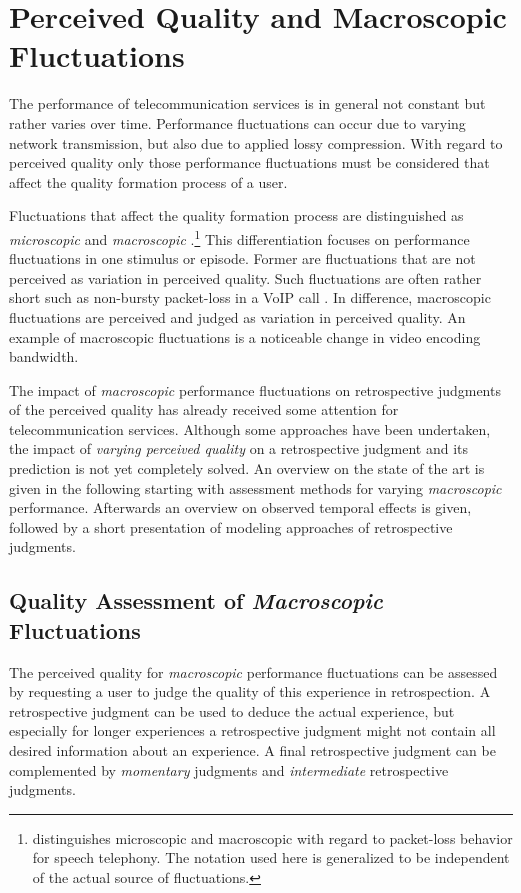 \section{Perceived Quality and Macroscopic Fluctuations}\label{chap:04}
The performance of telecommunication services is in general not constant but rather varies over time.
Performance fluctuations can occur due to varying network transmission, but also due to applied lossy compression.
With regard to perceived quality only those performance fluctuations must be considered that affect the quality formation process of a user.

Fluctuations that affect the quality formation process are distinguished as \emph{microscopic} and \emph{macroscopic} \citep[][p.~72]{raake_short-_2006}.\footnote{\citet{raake_short-_2006} distinguishes microscopic and macroscopic with regard to packet-loss behavior for speech telephony. The notation used here is generalized to be independent of the actual source of fluctuations.}
This differentiation focuses on performance fluctuations in one stimulus or episode.
Former are fluctuations that are not perceived as variation in perceived quality.
Such fluctuations are often rather short such as non-bursty packet-loss in a \ac{VoIP} call \citep[\cf,][p.~72]{raake_short-_2006}.
In difference, macroscopic fluctuations are perceived and judged as variation in perceived quality.
An example of macroscopic fluctuations is a noticeable change in video encoding bandwidth.

The impact of \emph{macroscopic} performance fluctuations on retrospective judgments of the perceived quality has already received some attention for telecommunication services.
Although some approaches have been undertaken, the impact of \emph{varying perceived quality} on a retrospective judgment and its prediction is not yet completely solved.
An overview on the state of the art is given in the following starting with assessment methods for varying \emph{macroscopic} performance.
Afterwards an overview on observed temporal effects is given, followed by a short presentation of modeling approaches of retrospective judgments.

\subsection{Quality Assessment of \emph{Macroscopic} Fluctuations}
The perceived quality for \emph{macroscopic} performance fluctuations can be assessed by requesting a user to judge the quality of this experience in retrospection.
A retrospective judgment can be used to deduce the actual experience, but especially for longer experiences a retrospective judgment might not contain all desired information about an experience.
A final retrospective judgment can be complemented by \emph{momentary} judgments and \emph{intermediate} retrospective judgments.

